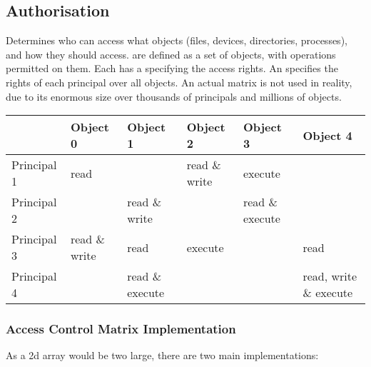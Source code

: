 \documentclass{report}
\begin{document}
{{    \subsection*{Authorisation}
        Determines who can access what objects (files, devices, directories, processes), and how they should access.
         are defined as a set of objects, with operations permitted on them. Each  has a  specifying the access rights.
        An  specifies the rights of each principal over all objects. An actual matrix is not used in reality, due to its enormous size over thousands of principals and millions of objects.
        \begin{center}
            \begin{tabular}{ |l | l | l | l | l | l |}
                \hline            
                & Object 0 & Object 1 & Object 2 & Object 3 & Object 4 \\
                \hline
                Principal 1 & read          &                  & read \& write & execute        &   \\
                Principal 2 &               & read \& write    &               & read \& execute&   \\ 
                Principal 3 & read \& write & read             & execute       &                & read \\
                Principal 4 &               & read \& execute  &               &                & read, write \& execute \\
                \hline
            \end{tabular}
        \end{center}
        \subsubsection*{Access Control Matrix Implementation}
            As a 2d array would be two large, there are two main implementations:
            \begin{itemize}
\end{itemize}}}
\end{document}
